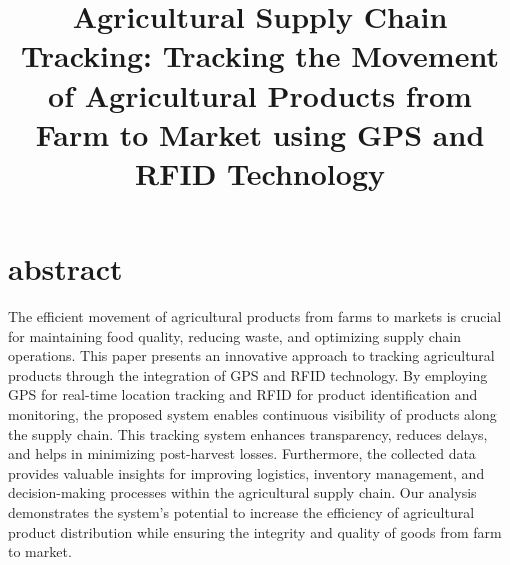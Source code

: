 \documentclass[conference]{IEEEtran}
\begin{document}
\title{Agricultural Supply Chain Tracking: Tracking the Movement of Agricultural Products from Farm to Market using GPS and RFID Technology}

\author{
\and
{}
\and
{}
\and
{}
\and
{}
\and
{}
}

\maketitle

\section*{abstract}
The efficient movement of agricultural products from farms to markets is crucial for maintaining food quality, reducing waste, and optimizing supply chain operations. This paper presents an innovative approach to tracking agricultural products through the integration of GPS and RFID technology. By employing GPS for real-time location tracking and RFID for product identification and monitoring, the proposed system enables continuous visibility of products along the supply chain. This tracking system enhances transparency, reduces delays, and helps in minimizing post-harvest losses. Furthermore, the collected data provides valuable insights for improving logistics, inventory management, and decision-making processes within the agricultural supply chain. Our analysis demonstrates the system's potential to increase the efficiency of agricultural product distribution while ensuring the integrity and quality of goods from farm to market.
\end{document}
